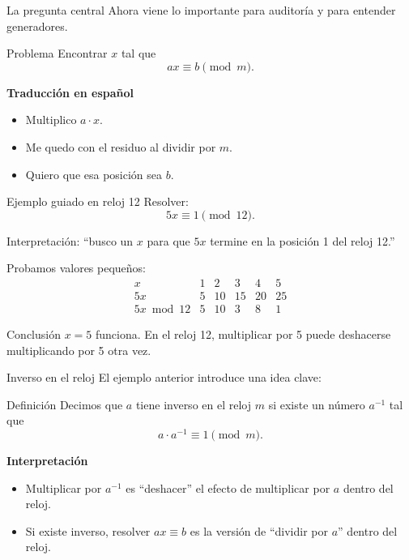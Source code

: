 \documentclass[aspectratio=1610, 9pt]{beamer}
\begin{document}
\begin{frame}{La pregunta central}
    Ahora viene lo importante para auditoría y para entender generadores.

    \vspace{0.35cm}
    \begin{block}{Problema}
    Encontrar $x$ tal que
    \[
    ax \equiv b \pmod m.
    \]
    \end{block}

    \vspace{0.25cm}
    \textbf{Traducción en español}
    \begin{itemize}
        \item Multiplico $a\cdot x$.
        \item Me quedo con el residuo al dividir por $m$.
        \item Quiero que esa posición sea $b$.
    \end{itemize}
\end{frame}

\begin{frame}{Ejemplo guiado en reloj 12}
    Resolver:
    \[
    5x \equiv 1 \pmod{12}.
    \]

    \vspace{0.2cm}
    Interpretación: ``busco un $x$ para que $5x$ termine en la posición 1 del reloj 12.''

    \vspace{0.25cm}
    Probamos valores pequeños:
    \[
    \begin{array}{c|ccccc}
    x & 1 & 2 & 3 & 4 & 5\\ \hline
    5x & 5 & 10 & 15 & 20 & 25\\
    5x \bmod 12 & 5 & 10 & 3 & 8 & 1
    \end{array}
    \]

    \vspace{0.2cm}
    \begin{exampleblock}{Conclusión}
    $x=5$ funciona. En el reloj 12, multiplicar por 5 puede deshacerse multiplicando por 5 otra vez.
    \end{exampleblock}
\end{frame}

\begin{frame}{Inverso en el reloj}
    El ejemplo anterior introduce una idea clave:

    \vspace{0.25cm}
    \begin{block}{Definición}
    Decimos que $a$ tiene inverso en el reloj $m$ si existe un número $a^{-1}$ tal que
    \[
    a\cdot a^{-1} \equiv 1 \pmod m.
    \]
    \end{block}

    \vspace{0.25cm}
    \textbf{Interpretación}
    \begin{itemize}
        \item Multiplicar por $a^{-1}$ es ``deshacer'' el efecto de multiplicar por $a$ dentro del reloj.
        \item Si existe inverso, resolver $ax\equiv b$ es la versión de ``dividir por $a$'' dentro del reloj.
    \end{itemize}
\end{frame}
\end{document}
